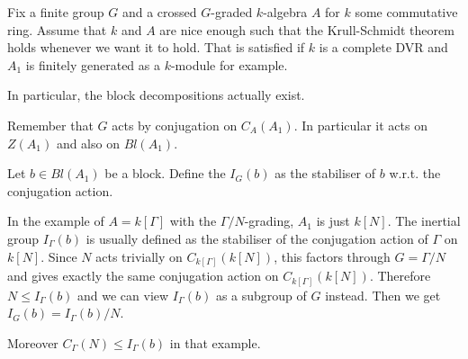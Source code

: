
\begin{convention}
Fix a finite group $G$ and a crossed $G$-graded $k$-algebra $A$ for $k$ some commutative ring. Assume that $k$ and $A$ are nice enough such that the Krull-Schmidt theorem holds whenever we want it to hold. That is satisfied if $k$ is a complete DVR and $A_1$ is finitely generated as a $k$-module for example.

In particular, the block decompositions actually exist.
\end{convention}

\begin{remark}
Remember that $G$ acts by conjugation on $C_A(A_1)$. In particular it acts on $Z(A_1)$ and also on $Bl(A_1)$.
\end{remark}

\begin{definition}
Let $b\in Bl(A_1)$ be a block. Define the  $I_G(b)$ as the stabiliser of $b$ w.r.t. the conjugation action.
\end{definition}

\begin{remark}
In the example of $A=k[\Gamma]$ with the $\Gamma/N$-grading, $A_1$ is just $k[N]$. The inertial group $I_\Gamma(b)$ is usually defined as the stabiliser of the conjugation action of $\Gamma$ on $k[N]$. Since $N$ acts trivially on $C_{k[\Gamma]}(k[N])$, this factors through $G=\Gamma/N$ and gives exactly the same conjugation action on $C_{k[\Gamma]}(k[N])$. Therefore $N \leq I_\Gamma(b)$ and we can view $I_\Gamma(b)$ as a subgroup of $G$ instead. Then we get $I_{G}(b)=I_\Gamma(b)/N$.

\medbreak
Moreover $C_\Gamma(N) \leq I_\Gamma(b)$ in that example.
\end{remark}
